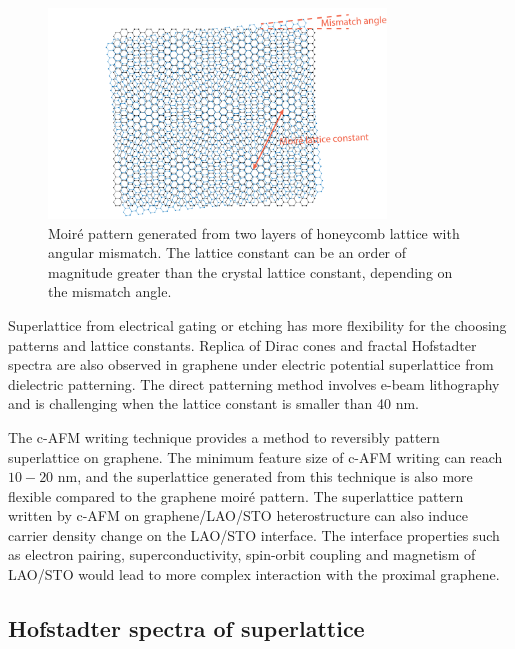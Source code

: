 \documentclass[pdflatex, sectionletters, 12pt]{pittetd}    %
\begin{document}
\begin{figure}[h!]
	\centering
	\includegraphics[width=0.8\textwidth]{Drawing/Moire.pdf}
	\caption{Moir{\'e} pattern generated from two layers of honeycomb lattice with angular mismatch. The lattice constant can be an order of magnitude greater than the crystal lattice constant, depending on the mismatch angle.}
	\label{FIG:Moire}
\end{figure}

Superlattice from electrical gating\cite{forsythe2018band} or etching\cite{jessen2019lithographic} has more flexibility for the choosing patterns and lattice constants. Replica of Dirac cones and fractal Hofstadter spectra are also observed in graphene under electric potential superlattice from dielectric patterning\cite{forsythe2018band}. The direct patterning method involves e-beam lithography and is challenging when the lattice constant is smaller than 40 nm.

The c-AFM writing technique provides a method to reversibly pattern superlattice on graphene. The minimum feature size of c-AFM writing can reach $10-20$ nm\cite{huang2015electric}, and the superlattice generated from this technique is also more flexible compared to the graphene moir{\'e} pattern. The superlattice pattern written by c-AFM on graphene/LAO/STO heterostructure can also induce carrier density change on the LAO/STO interface\cite{huang2015electric}. The interface properties such as electron pairing\cite{cheng2015electron}, superconductivity\cite{reyren2007superconducting}, spin-orbit coupling\cite{caviglia2010tunable, zhong2013theory} and magnetism\cite{bi2014room} of LAO/STO would lead to more complex interaction with the proximal graphene.

\subsection{Hofstadter spectra of superlattice}
\end{document}

